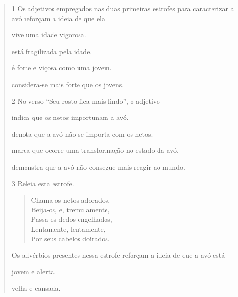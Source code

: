 \begin{quote}
\num{1} Os adjetivos empregados nas duas primeiras estrofes para caracterizar a avó reforçam a ideia de que ela.

\begin{escolha}
\item vive uma idade vigorosa.

\item está fragilizada pela idade.

\item é forte e viçosa como uma jovem.

\item considera-se mais forte que os jovens.
\end{escolha}



\num{2} No verso “Seu rosto fica mais lindo”, o adjetivo

\begin{escolha}
\item indica que os netos importunam a avó.

\item denota que a avó não se importa com os netos.

\item marca que ocorre uma transformação no estado da avó.

\item demonstra que a avó não consegue mais reagir ao mundo.
\end{escolha}



\num{3} Releia esta estrofe.

\begin{verse}
Chama os netos adorados,\\
Beija-os, e, tremulamente,\\
Passa os dedos engelhados,\\
Lentamente, lentamente,\\
Por seus cabelos doirados.
\end{verse}

Os advérbios presentes nessa estrofe reforçam a ideia de que a avó está

\begin{escolha}
\item jovem e alerta.

\item velha e cansada.


\end{escolha}
\end{quote}
